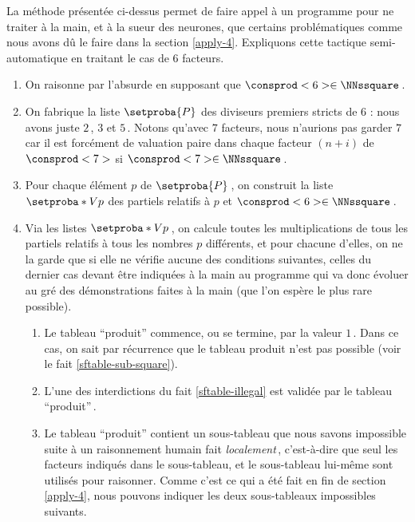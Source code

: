 La méthode présentée ci-dessus permet de faire appel à un programme pour ne traiter à la main, et à la sueur des neurones, que certains \sftab[x] problématiques comme nous avons dû le faire dans la section \ref{apply-4}.
Expliquons cette tactique semi-automatique en traitant le cas de $6$ facteurs.


\begin{enumerate}
	\item On raisonne par l'absurde en supposant que $\consprod<6> \in \NNssquare$\,.


	\item On fabrique la liste $\setproba{P}$ des diviseurs premiers stricts de $6$ : nous avons juste $2$\,, $3$ et $5$\,.
	Notons qu'avec $7$ facteurs, nous n'aurions pas garder $7$ car il est forcément de valuation paire dans chaque facteur $(n + i)$ de $\consprod<7>$ si $\consprod<7> \in \NNssquare$\,.


	\item Pour chaque élément $p$ de $\setproba{P}$\,, on construit la liste $\setproba*{V}{p}$ des \sftab[x] partiels relatifs à $p$ et $\consprod<6> \in \NNssquare$\,.


	\item Via les listes $\setproba*{V}{p}$\,, on calcule toutes les multiplications de tous les \sftab[x] partiels relatifs à tous les nombres $p$ différents, et pour chacune d'elles, on ne la garde que si elle ne vérifie aucune des conditions suivantes, celles du dernier cas devant être indiquées à la main au programme qui va donc évoluer au gré des démonstrations faites à la main (que l'on espère le plus rare possible).
	\begin{enumerate}
		\item Le tableau \enquote{produit} commence, ou se termine, par la valeur $1$\,. Dans ce cas, on sait par récurrence que le tableau produit n'est pas possible (voir le fait \ref{sftable-sub-square}).

		\item L'une des interdictions du fait \ref{sftable-illegal} est validée par le tableau \enquote{produit}\,.

		\item Le tableau \enquote{produit} contient un sous-tableau que nous savons impossible suite à un raisonnement humain fait \emph{localement}\,, c'est-à-dire que seul les facteurs indiqués dans le sous-tableau, et le sous-tableau lui-même sont utilisés pour raisonner.
		Comme c'est ce qui a été fait en fin de section \ref{apply-4}, nous pouvons indiquer les deux sous-tableaux impossibles suivants.
	\end{enumerate}
\end{enumerate}

